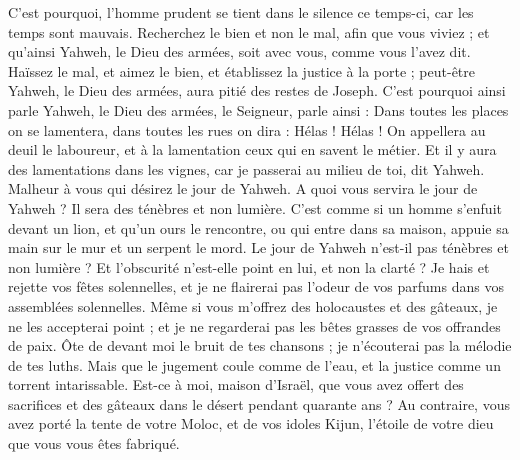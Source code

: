 \begin{multicols}{2}
C'est pourquoi, l'homme prudent se tient dans le silence ce temps-ci, car les temps sont mauvais.
Recherchez le bien et non le mal, afin que vous viviez ; et qu'ainsi Yahweh, le Dieu des armées, soit avec vous, comme vous l'avez dit.
Haïssez le mal, et aimez le bien, et établissez la justice à la porte ; peut-être Yahweh, le Dieu des armées, aura pitié des restes de Joseph.
C'est pourquoi ainsi parle Yahweh, le Dieu des armées, le Seigneur, parle ainsi : Dans toutes les places on se lamentera, dans toutes les rues on dira : Hélas ! Hélas ! On appellera au deuil le laboureur, et à la lamentation ceux qui en savent le métier.
Et il y aura des lamentations dans les vignes, car je passerai au milieu de toi, dit Yahweh.
Malheur à vous qui désirez le jour de Yahweh. A quoi vous servira le jour de Yahweh ? Il sera des ténèbres et non  lumière.
C'est comme si un homme s'enfuit devant un lion, et qu'un ours le rencontre, ou qui entre dans sa maison, appuie sa main sur le mur et un serpent le mord.
Le jour de Yahweh n'est-il pas ténèbres et non lumière ? Et l'obscurité n'est-elle point en lui, et non la clarté ? 
Je hais et rejette vos fêtes solennelles, et je ne flairerai pas l'odeur de vos parfums dans vos assemblées solennelles. 
Même si vous m'offrez des holocaustes et des gâteaux, je ne les accepterai point ; et je ne regarderai pas les bêtes grasses de vos offrandes de paix.
Ôte de devant moi le bruit de tes chansons ; je n'écouterai pas la mélodie de tes luths.
Mais que le jugement coule comme de l'eau, et la justice comme un torrent intarissable.
Est-ce à moi, maison d'Israël, que vous avez offert des sacrifices et des gâteaux dans le désert pendant quarante ans ? 
Au contraire, vous avez porté la tente de votre Moloc, et de vos idoles Kijun, l'étoile de votre dieu que vous vous êtes fabriqué.

\end{multicols}
